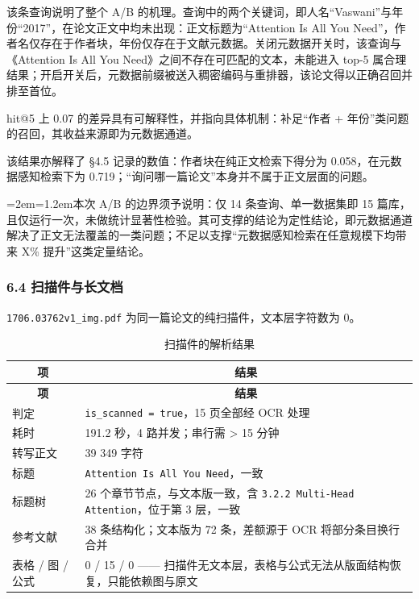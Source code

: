 \documentclass[UTF8,fontset=windows,zihao=5,a4paper]{ctexart}
\newenvironment{aside}{\par\vspace{3pt}\begingroup\zihao{5}%
  \leftskip=2em\rightskip=1.2em\noindent\ignorespaces}{\par\endgroup\vspace{3pt}}
\begin{document}
该条查询说明了整个 A/B 的机理。查询中的两个关键词，即人名“Vaswani”与年份“2017”，在论文正文中均未出现：正文标题为“Attention Is All You Need”，作者名仅存在于作者块，年份仅存在于文献元数据。关闭元数据开关时，该查询与《Attention Is All You Need》之间不存在可匹配的文本，未能进入 top-5 属合理结果；开启开关后，元数据前缀被送入稠密编码与重排器，该论文得以正确召回并排至首位。

hit@5 上 0.07 的差异具有可解释性，并指向具体机制：补足“作者 + 年份”类问题的召回，其收益来源即为元数据通道。

该结果亦解释了 §4.5 记录的数值：作者块在纯正文检索下得分为 0.058，在元数据感知检索下为 0.719；“询问哪一篇论文”本身并不属于正文层面的问题。

\begin{aside}本次 A/B 的边界须予说明：仅 14 条查询、单一数据集即 15 篇库，且仅运行一次，未做统计显著性检验。其可支撑的结论为定性结论，即元数据通道解决了正文无法覆盖的一类问题；不足以支撑“元数据感知检索在任意规模下均带来 X\% 提升”这类定量结论。\end{aside}

\subsubsection*{6.4 扫描件与长文档}
\texttt{1706.03762v1\_\allowbreak{}img.pdf} 为同一篇论文的纯扫描件，文本层字符数为 0。

\begin{longtable}{@{}p{}p{}@{}}
\caption{扫描件的解析结果}\\
\toprule
\multicolumn{1}{c}{\textbf{项}} & \multicolumn{1}{c}{\textbf{结果}} \\
\midrule
\endfirsthead
\toprule
\multicolumn{1}{c}{\textbf{项}} & \multicolumn{1}{c}{\textbf{结果}} \\
\midrule
\endhead
\bottomrule
\endfoot
判定 & \texttt{is\_\allowbreak{}scanned = true}，15 页全部经 OCR 处理 \\
耗时 & 191.2 秒，4 路并发；串行需 > 15 分钟 \\
转写正文 & 39 349 字符 \\
标题 & \texttt{Attention Is All You Need}，一致 \\
标题树 & 26 个章节节点，与文本版一致，含 \texttt{3.2.2 Multi-Head Attention}，位于第 3 层，一致 \\
参考文献 & 38 条结构化；文本版为 72 条，差额源于 OCR 将部分条目换行合并 \\
表格 / 图 / 公式 & 0 / 15 / 0 —— 扫描件无文本层，表格与公式无法从版面结构恢复，只能依赖图与原文 \\
\end{longtable}
\end{document}
